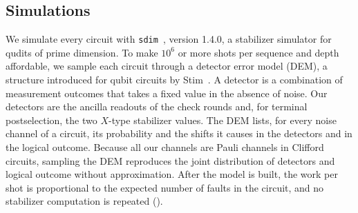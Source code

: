 \subsection{Simulations}
\label{sub:sim_framework}

We simulate every circuit with \texttt{sdim}~\cite{sdim}, version 1.4.0, a stabilizer simulator for qudits of prime dimension. To make $10^6$ or more shots per sequence and depth affordable, we sample each circuit through a detector error model (DEM), a structure introduced for qubit circuits by Stim~\cite{Gidney2021Stim}. A detector is a combination of measurement outcomes that takes a fixed value in the absence of noise. Our detectors are the ancilla readouts of the check rounds and, for terminal postselection, the two $X$-type stabilizer values. The DEM lists, for every noise channel of a circuit, its probability and the shifts it causes in the detectors and in the logical outcome. Because all our channels are Pauli channels in Clifford circuits, sampling the DEM reproduces the joint distribution of detectors and logical outcome without approximation. After the model is built, the work per shot is proportional to the expected number of faults in the circuit, and no stabilizer computation is repeated ().

